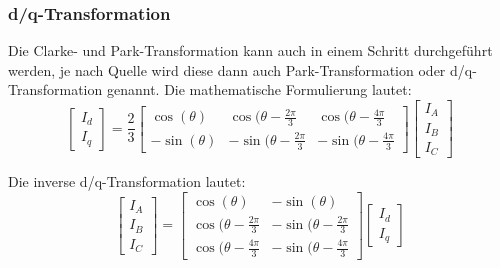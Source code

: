 \subsubsection*{d/q-Transformation} 
Die Clarke- und Park-Transformation kann auch in einem Schritt durchgeführt werden, je nach Quelle wird diese dann auch Park-Transformation oder d/q-Transformation genannt\cite{dqTrafo_Wiki}.
Die mathematische Formulierung lautet:
\begin{equation}\label{dqTrafo}
\left[
\begin{array}{c}
I_d \\ 
I_q
\end{array} 
\right]
= \frac{2}{3}
\left[
\begin{array}{ccc}
\cos (\theta) & \cos (\theta-\frac{2\pi}{3} & \cos (\theta-\frac{4\pi}{3} \\ 
-\sin (\theta) & -\sin (\theta-\frac{2\pi}{3} & -\sin (\theta-\frac{4\pi}{3}
\end{array} 
\right] 
\left[
\begin{array}{c}
I_A \\ 
I_B \\
I_C
\end{array} 
\right]
\end{equation}

Die inverse d/q-Transformation lautet:
\begin{equation}\label{invdqTrafo}
\left[
\begin{array}{c}
I_A \\ 
I_B \\
I_C
\end{array} 
\right]
=
\left[
\begin{array}{cc}
\cos (\theta) & -\sin (\theta) \\
\cos (\theta-\frac{2\pi}{3} & -\sin (\theta-\frac{2\pi}{3} \\
\cos (\theta-\frac{4\pi}{3} & -\sin (\theta-\frac{4\pi}{3} 
\end{array} 
\right] 
\left[
\begin{array}{c}
I_d \\ 
I_q
\end{array} 
\right]
\end{equation}


